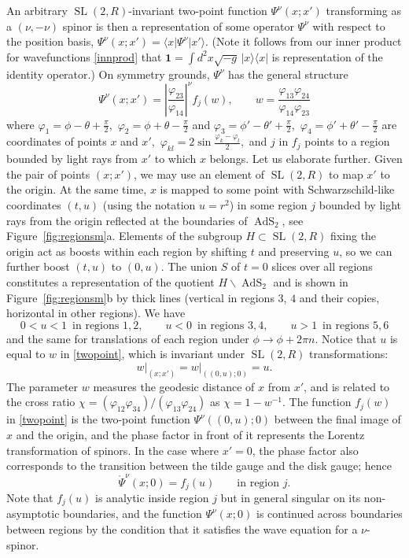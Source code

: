 \documentclass[12pt]{article}
\newcommand{\be}{\begin{equation}}
\newcommand{\ee}{\end{equation}}
\newcommand{\lt}{\left}
\newcommand{\rt}{\right}
\newcommand*{\bra}[1]{\langle{#1}|}
\newcommand*{\ket}[1]{|{#1}\rangle}
\newcommand{\vp}{\varphi}
\newcommand{\RR}{\mathbb{R}}
\DeclareMathOperator{\tSL}{\widetilde{\mathrm{SL}}}
\DeclareMathOperator{\tAdS}{\widetilde{AdS}}
\newcommand{\unit}{\mathbf{1}}
\newcommand{\rPsi}{\mathring{\Psi}}
\def\widetilde#1{#1}%
\def\RR{R}
\begin{document}
An arbitrary $\tSL(2,\RR)$-invariant two-point function $\Psi^{\nu}(x; x')$ transforming as a $(\nu, -\nu)$ spinor is then a representation of some operator $\Psi^{\nu}$ with respect to the position basis, $\Psi^{\nu}(x; x')=\bra{x}{\Psi^{\nu}\ket{x'}}$. (Note it follows from our inner product for wavefunctions \eqref{innprod} that $\unit=\int d^2x \sqrt{-g}\,\ket{x}\bra{x}$ is representation of the identity operator.) On symmetry grounds, $\Psi^{\nu}$ has the general structure
\be \label{twopoint}
\Psi^{\nu}(x;x')=\left|\frac{\vp_{23}}{\vp_{14}}\right|^{\nu}f_{j}(w),\qquad
w=\frac{\vp_{13}\vp_{24}}{\vp_{14}\vp_{23}}
\ee
where $\vp_1=\phi-\theta+\frac{\pi}{2}$,\, $\vp_2=\phi+\theta-\frac{\pi}{2}$ and $\vp_3=\phi'-\theta'+\frac{\pi}{2}$,\, $\vp_4=\phi'+\theta'-\frac{\pi}{2}$ are coordinates of points $x$ and $x'$,\, $\vp_{kl}=2\sin\frac{\vp_k-\vp_l}{2}$,\, and $j$ in $f_j$ points to a region bounded by light rays from $x'$ to which $x$ belongs. Let us elaborate further. Given the pair of points $(x;x')$, we may use an element of $\tSL(2,\RR)$ to map $x'$ to the origin. At the same time, $x$ is mapped to some point with Schwarzschild-like coordinates $(t,u)$ (using the notation $u=r^2$) in some region $j$ bounded by light rays from the origin reflected at the boundaries of $\tAdS_2$, see Figure~\ref{fig:regionsm}a. Elements of the subgroup $H \subset \tSL(2,\RR)$ fixing the origin act as boosts within each region by shifting $t$ and preserving $u$, so we can further boost $(t,u)$ to $(0,u)$. The union $S$ of $t=0$ slices over all regions constitutes a representation of the quotient $H\backslash \tAdS_2$ and is shown in Figure~\ref{fig:regionsm}b by thick lines (vertical in regions $3$, $4$ and their copies, horizontal in other regions). We have
\be \label{urange}
0<u<1\, \text{ in regions }1,2,\qquad
u<0\, \text{ in regions }3,4,\qquad
u>1\, \text{ in regions }5,6
\ee
and the same for translations of each region under $\phi \to \phi+2\pi n$. Notice that $u$ is equal to $w$ in \eqref{twopoint}, which is invariant under $\tSL(2,\RR)$ transformations:
\begin{equation} \label{wurel}
\lt. w \rt|_{(x;x')}=\lt. w \rt |_{((0,u);0)}=u.
\end{equation}
The parameter $w$ measures the geodesic distance of $x$ from $x'$, and is related to the cross ratio $\chi=(\vp_{12}\vp_{34})/(\vp_{13}\vp_{24})$ as $\chi=1-w^{-1}$. The function $f_j(w)$ in \eqref{twopoint} is the two-point function $\Psi^{\nu}((0,u);0)$ between the final image of $x$ and the origin, and the phase factor in front of it represents the Lorentz transformation of spinors. In the case where $x'=0$, the phase factor also corresponds to the transition between the tilde gauge and the disk gauge; hence 
\begin{equation}
\rPsi^{\nu}(x;0)=f_j(u)\qquad \text{in region }j.
\end{equation}
Note that $f_j(u)$ is analytic inside region $j$ but in general singular on its non-asymptotic boundaries, and the function $\Psi^{\nu}(x;0)$ is continued across boundaries between regions by the condition that it satisfies the wave equation for a $\nu$-spinor. 
\end{document}
